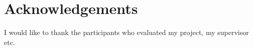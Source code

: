 \section*{Acknowledgements}

I would like to thank the participants who evaluated my project, my supervisor etc.






